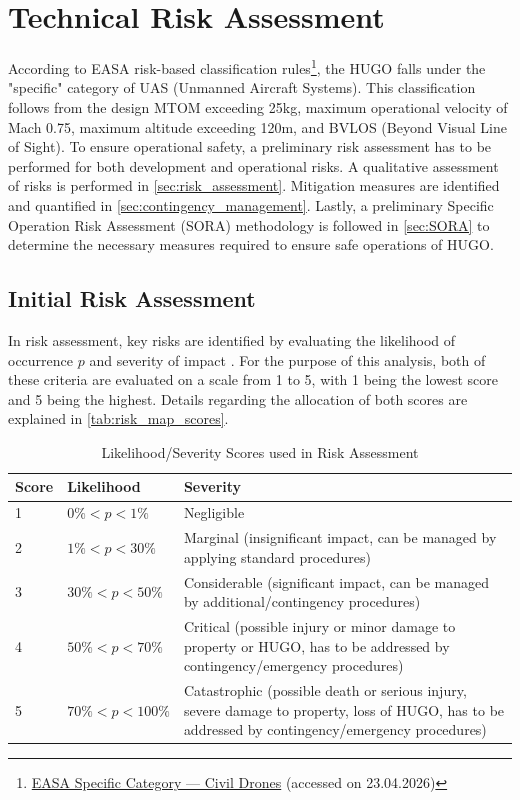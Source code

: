 \chapter{Technical Risk Assessment}
According to EASA risk-based classification rules\footnote{\href{https://www.easa.europa.eu/en/domains/drones-air-mobility/operating-drone/specific-category-civil-drones}{EASA Specific Category — Civil Drones} (accessed on 23.04.2026)}, the HUGO falls under the "specific" category of UAS (Unmanned Aircraft Systems). This classification follows from the design MTOM exceeding 25kg, maximum operational velocity of Mach 0.75, maximum altitude exceeding 120m, and BVLOS (Beyond Visual Line of Sight). To ensure operational safety, a preliminary risk assessment has to be performed for both development and operational risks. A qualitative assessment of risks is performed in \autoref{sec:risk_assessment}. Mitigation measures are identified and quantified in \autoref{sec:contingency_management}. Lastly, a preliminary Specific Operation Risk Assessment (SORA) methodology is followed in \autoref{sec:SORA} to determine the necessary measures required to ensure safe operations of HUGO.

\section{Initial Risk Assessment}
\label{sec:risk_assessment}

In risk assessment, key risks are identified by evaluating the likelihood of occurrence $p$ and severity of impact \cite{Lanzafame2024}. For the purpose of this analysis, both of these criteria are evaluated on a scale from 1 to 5, with 1 being the lowest score and 5 being the highest. Details regarding the allocation of both scores are explained in \autoref{tab:risk_map_scores}. 

\begin{table}[H]
    \centering
        \caption{Likelihood/Severity Scores used in Risk Assessment \cite{MITRECorporation2012}}
    \begin{tabular}{|p{1cm}|p{3.5cm}|p{10.5cm}|}
    \hline
        \textbf{Score} & \textbf{Likelihood} & \textbf{Severity} \\ \hline\hline
         1 & $0\%< p<1\%$ & Negligible \\   \hline
         2 & $1\%<p<30\%$ & Marginal (insignificant impact, can be managed by applying standard procedures) \\   \hline
         3 & $30\%<p<50\%$& Considerable (significant impact, can be managed by additional/contingency procedures) \\   \hline
         4 & $50\%<p<70\%$& Critical (possible injury or minor damage to property or HUGO, has to be addressed by contingency/emergency procedures) \\   \hline
         5 & $70\%<p<100\%$& Catastrophic (possible death or serious injury, severe damage to property, loss of HUGO, has to be addressed by contingency/emergency procedures) \\   \hline
    \end{tabular}
    \label{tab:risk_map_scores}
\end{table}

